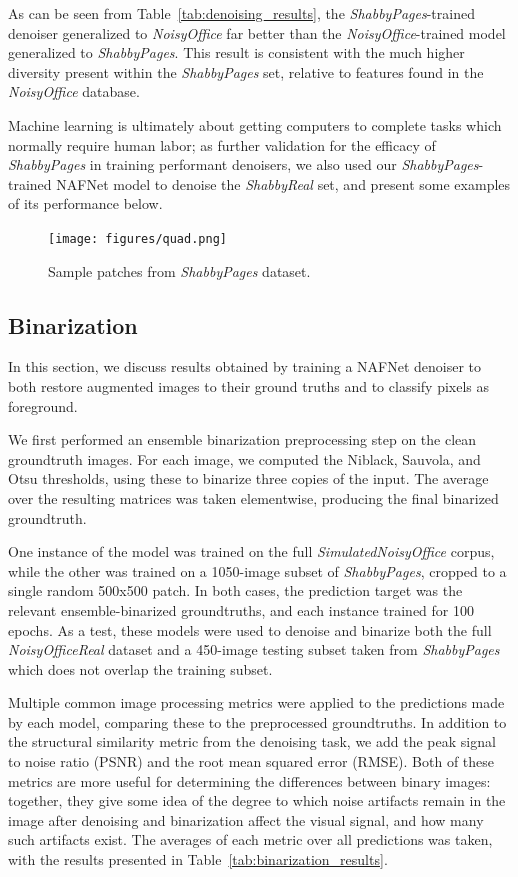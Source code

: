 \documentclass[runningheads]{llncs}
\begin{document}
As can be seen from Table~\ref{tab:denoising_results}, the \emph{ShabbyPages}-trained denoiser generalized to \emph{NoisyOffice} far better than the \emph{NoisyOffice}-trained model generalized to \emph{ShabbyPages}. This result is consistent with the much higher diversity present within the \emph{ShabbyPages} set, relative to features found in the \emph{NoisyOffice} database.

Machine learning is ultimately about getting computers to complete tasks which normally require human labor; as further validation for the efficacy of \emph{ShabbyPages} in training performant denoisers, we also used our \emph{ShabbyPages}-trained NAFNet model to denoise the \emph{ShabbyReal} set, and present some examples of its performance below.

\begin{figure}
\centering
\texttt{[image: figures/quad.png]}
\caption{Sample patches from \emph{ShabbyPages} dataset.}
\label{fig:shabbyreal_denoising}
\end{figure}

\subsection{Binarization}
In this section, we discuss results obtained by training a NAFNet denoiser to both restore augmented images to their ground truths and to classify pixels as foreground.

We first performed an ensemble binarization preprocessing step on the clean groundtruth images.
For each image, we computed the Niblack, Sauvola, and Otsu thresholds, using these to binarize three copies of the input. The average over the resulting matrices was taken elementwise, producing the final binarized groundtruth.

One instance of the model was trained on the full \emph{SimulatedNoisyOffice} corpus, while the other was trained on a 1050-image subset of \emph{ShabbyPages}, cropped to a single random 500x500 patch. In both cases, the prediction target was the relevant ensemble-binarized groundtruths, and each instance trained for 100 epochs.
As a test, these models were used to denoise and binarize both the full \emph{NoisyOfficeReal} dataset and a 450-image testing subset taken from \emph{ShabbyPages} which does not overlap the training subset.

Multiple common image processing metrics were applied to the predictions made by each model, comparing these to the preprocessed groundtruths.
In addition to the structural similarity metric from the denoising task, we add the peak signal to noise ratio (PSNR) and the root mean squared error (RMSE). Both of these metrics are more useful for determining the differences between binary images: together, they give some idea of the degree to which noise artifacts remain in the image after denoising and binarization affect the visual signal, and how many such artifacts exist.
The averages of each metric over all predictions was taken, with the results presented in Table~\ref{tab:binarization_results}.
\end{document}
